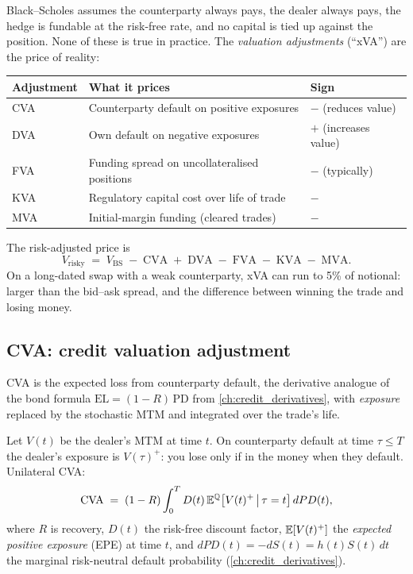 Black--Scholes assumes the counterparty always pays, the dealer
always pays, the hedge is fundable at the risk-free rate, and no
capital is tied up against the position.  None of these is true in
practice.  The \emph{valuation adjustments} (``xVA'') are the price
of reality:

\begin{center}
\small
\begin{tabular}{@{}lll@{}}
\toprule
Adjustment & What it prices & Sign \\
\midrule
CVA & Counterparty default on positive exposures & $-$ (reduces value) \\
DVA & Own default on negative exposures         & $+$ (increases value) \\
FVA & Funding spread on uncollateralised positions & $-$ (typically) \\
KVA & Regulatory capital cost over life of trade & $-$ \\
MVA & Initial-margin funding (cleared trades)   & $-$ \\
\bottomrule
\end{tabular}
\end{center}

The risk-adjusted price is
\[
  V_{\mathrm{risky}}
  \;=\; V_{\mathrm{BS}}
  \;-\; \mathrm{CVA}
  \;+\; \mathrm{DVA}
  \;-\; \mathrm{FVA}
  \;-\; \mathrm{KVA}
  \;-\; \mathrm{MVA}.
\]
On a long-dated swap with a weak counterparty, xVA can run to 5\%
of notional: larger than the bid--ask spread, and the difference
between winning the trade and losing money.

\subsection{CVA: credit valuation adjustment}

CVA is the expected loss from counterparty default, the
derivative analogue of the bond formula $\mathrm{EL} =
(1-R)\,\mathrm{PD}$ from \cref{ch:credit_derivatives}, with
\emph{exposure} replaced by the stochastic MTM and integrated over
the trade's life.

\begin{keyfactbox}
Let $V(t)$ be the dealer's MTM at time $t$.  On counterparty
default at time $\tau \le T$ the dealer's exposure is $V(\tau)^+$:
you lose only if in the money when they default.  Unilateral
CVA:
\[
  \mathrm{CVA}
  \;=\; (1-R) \int_0^T D(t)\,
       \mathbb{E}^{\mathbb{Q}} \big[V(t)^+ \,\big|\, \tau = t\big]\,
       dPD(t),
\]
where $R$ is recovery, $D(t)$ the risk-free discount factor,
$\mathbb{E}[V(t)^+]$ the \emph{expected positive exposure} (EPE) at time
$t$, and $dPD(t) = -dS(t) = h(t) S(t)\,dt$ the marginal risk-neutral
default probability (\cref{ch:credit_derivatives}).
\end{keyfactbox}

